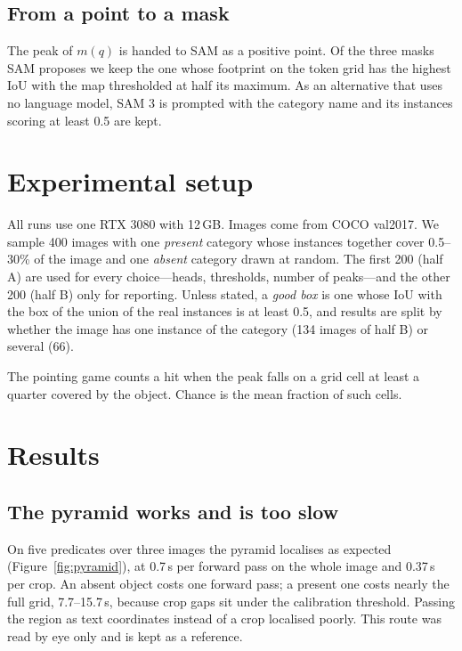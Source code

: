 \documentclass[10pt,twocolumn]{article}
\begin{document}
\subsection{From a point to a mask}

The peak of $m(q)$ is handed to SAM as a positive point. Of the three masks SAM
proposes we keep the one whose footprint on the token grid has the highest IoU
with the map thresholded at half its maximum. As an alternative that uses no
language model, SAM 3 is prompted with the category name and its instances
scoring at least 0.5 are kept.

\section{Experimental setup}

All runs use one RTX 3080 with 12\,GB. Images come from COCO val2017. We
sample 400 images with one \emph{present} category whose instances together
cover 0.5--30\% of the image and one \emph{absent} category drawn at random.
The first 200 (half A) are used for every choice---heads, thresholds, number
of peaks---and the other 200 (half B) only for reporting. Unless stated, a
\emph{good box} is one whose IoU with the box of the union of the real
instances is at least 0.5, and results are split by whether the image has one
instance of the category (134 images of half B) or several (66).

The pointing game counts a hit when the peak falls on a grid cell at least a
quarter covered by the object. Chance is the mean fraction of such cells.

\section{Results}

\subsection{The pyramid works and is too slow}

On five predicates over three images the pyramid localises as expected
(Figure~\ref{fig:pyramid}), at 0.7\,s per forward pass on the whole image and
0.37\,s per crop. An absent object costs one forward pass; a present one costs
nearly the full grid, 7.7--15.7\,s, because crop gaps sit under the calibration
threshold. Passing the region as text coordinates instead of a crop localised
poorly. This route was read by eye only and is kept as a reference.
\end{document}
